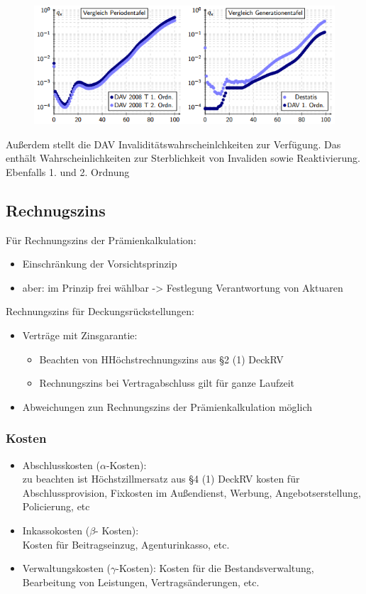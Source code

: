 \documentclass[12pt]{report}
\theoremstyle{dotless}
\theoremstyle{definition}
\begin{document}
\begin{figure}[ht]
	\centering
	\includegraphics[scale=1]{Bilder/SterbetafelBsp2.png}
\end{figure}
Außerdem stellt die DAV Invaliditätswahrscheinlchkeiten zur Verfügung. Das enthält Wahrscheinlichkeiten zur Sterblichkeit von Invaliden sowie Reaktivierung. Ebenfalls 1. und 2. Ordnung

\subsection{Rechnugszins}
Für Rechnungszins der Prämienkalkulation:
\begin{itemize}
\item Einschränkung der Vorsichtsprinzip
\item aber: im Prinzip frei wählbar -> Festlegung Verantwortung von Aktuaren
\end{itemize}
Rechnungszins für Deckungsrückstellungen:
\begin{itemize}
\item Verträge mit Zinsgarantie:
\begin{itemize}
\item Beachten von HHöchstrechnungszins aus §2 (1) DeckRV
\item Rechnungszins bei Vertragabschluss gilt für ganze Laufzeit
\end{itemize}
\item Abweichungen zun Rechnungszins der Prämienkalkulation möglich
\end{itemize}

\subsubsection{Kosten}
\begin{itemize}
\item Abschlusskosten ($\alpha$-Kosten):\\
zu beachten ist Höchstzillmersatz aus §4 (1) DeckRV kosten für Abschlussprovision, Fixkosten im Außendienst, Werbung, Angebotserstellung, Policierung, etc
\item Inkassokosten ($\beta$- Kosten):\\
Kosten für Beitragseinzug, Agenturinkasso, etc.
\item Verwaltungskosten ($\gamma$-Kosten):
Kosten für die Bestandsverwaltung, Bearbeitung von Leistungen, Vertragsänderungen, etc.
\end{itemize}
\end{document}
